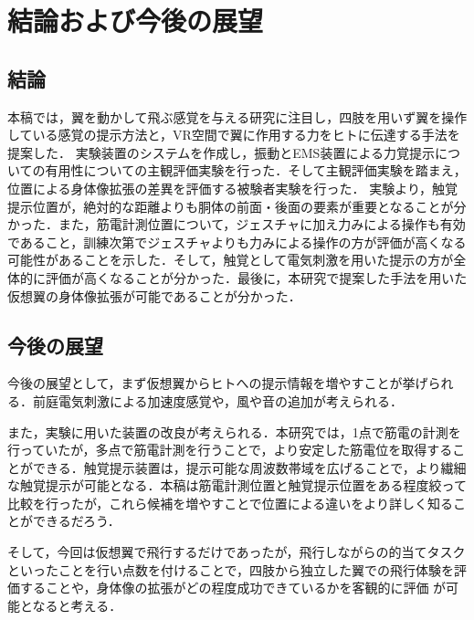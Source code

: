 \chapter[結論および今後の展望]%
        {結論および今後の展望}

\section{結論}
    本稿では，翼を動かして飛ぶ感覚を与える研究に注目し，四肢を用いず翼を操作している感覚の提示方法と，VR空間で翼に作用する力をヒトに伝達する手法を提案した．
    実験装置のシステムを作成し，振動とEMS装置による力覚提示についての有用性についての主観評価実験を行った．そして主観評価実験を踏まえ，位置による身体像拡張の差異を評価する被験者実験を行った．
    実験より，触覚提示位置が，絶対的な距離よりも胴体の前面・後面の要素が重要となることが分かった．また，筋電計測位置について，ジェスチャに加え力みによる操作も有効であること，訓練次第でジェスチャよりも力みによる操作の方が評価が高くなる可能性があることを示した．そして，触覚として電気刺激を用いた提示の方が全体的に評価が高くなることが分かった．最後に，本研究で提案した手法を用いた仮想翼の身体像拡張が可能であることが分かった．

    
\section{今後の展望}
    今後の展望として，まず仮想翼からヒトへの提示情報を増やすことが挙げられる．前庭電気刺激による加速度感覚\cite{maeda2005shaking}\cite{青山一真2014前庭電気刺激における逆方向不感電流を用いた加速度感覚の増強}や，風や音の追加が考えられる．

    また，実験に用いた装置の改良が考えられる．本研究では，1点で筋電の計測を行っていたが，多点で筋電計測を行うことで，より安定した筋電位を取得することができる\cite{白石恵1992筋電位多点計測による体幹背部の神経支配帯の分布}．触覚提示装置は，提示可能な周波数帯域を広げることで，より繊細な触覚提示が可能となる．本稿は筋電計測位置と触覚提示位置をある程度絞って比較を行ったが，これら候補を増やすことで位置による違いをより詳しく知ることができるだろう．

    そして，今回は仮想翼で飛行するだけであったが，飛行しながらの的当てタスクといったことを行い点数を付けることで，四肢から独立した翼での飛行体験を評価することや，身体像の拡張がどの程度成功できているかを客観的に評価
    が可能となると考える．
  
